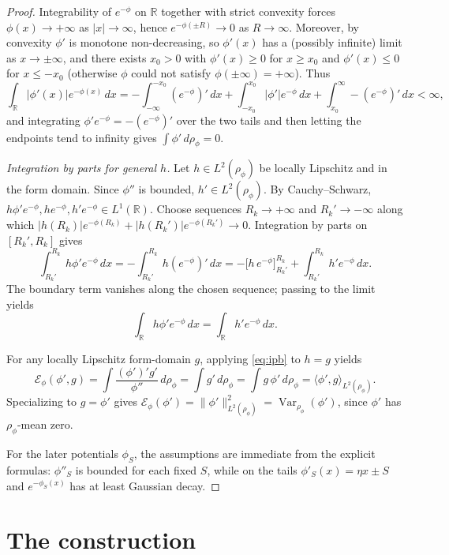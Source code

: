 \documentclass{article}
\theoremstyle{remark}
\DeclareMathOperator{\Var}{Var}
\begin{document}
\begin{proof}
Integrability of $e^{-\phi}$ on $\mathbb R$ together with strict convexity
forces $\phi(x)\to+\infty$ as $|x|\to\infty$, hence $e^{-\phi(\pm R)}\to 0$
as $R\to\infty$. Moreover, by convexity $\phi'$ is monotone non-decreasing,
so $\phi'(x)$ has a (possibly infinite) limit as $x\to\pm\infty$, and there
exists $x_0>0$ with $\phi'(x)\ge 0$ for $x\ge x_0$ and $\phi'(x)\le 0$ for
$x\le -x_0$ (otherwise $\phi$ could not satisfy $\phi(\pm\infty)=+\infty$).
Thus
\[
  \int_{\mathbb R}|\phi'(x)|e^{-\phi(x)}\,dx
  = -\int_{-\infty}^{-x_0}(e^{-\phi})'\,dx
    +\int_{-x_0}^{x_0}|\phi'|e^{-\phi}\,dx
    +\int_{x_0}^{\infty}-(e^{-\phi})'\,dx <\infty,
\]
and integrating $\phi'e^{-\phi}=-(e^{-\phi})'$ over the two tails and then
letting the endpoints tend to infinity gives
$\int\phi'\,d\rho_\phi=0$.

\emph{Integration by parts for general $h$.} Let
$h\in L^2(\rho_\phi)$ be locally Lipschitz and in the form domain. Since
$\phi''$ is bounded, $h'\in L^2(\rho_\phi)$. By Cauchy--Schwarz,
$h\phi' e^{-\phi}, h e^{-\phi}, h' e^{-\phi}\in L^1(\mathbb R)$.
Choose sequences $R_k\to+\infty$ and $R_k'\to-\infty$ along which
$|h(R_k)|e^{-\phi(R_k)}+|h(R_k')|e^{-\phi(R_k')}\to0$. Integration by parts on
$[R_k',R_k]$ gives
\[
  \int_{R_k'}^{R_k}h\phi' e^{-\phi}\,dx
  = -\int_{R_k'}^{R_k}h(e^{-\phi})'\,dx
  = -\bigl[h\,e^{-\phi}\bigr]_{R_k'}^{R_k}
    +\int_{R_k'}^{R_k}h' e^{-\phi}\,dx.
\]
The boundary term vanishes along the chosen sequence; passing to the limit
yields
\begin{equation}\label{eq:ipb}
  \int_{\mathbb R} h\phi' e^{-\phi}\,dx
  = \int_{\mathbb R} h' e^{-\phi}\,dx.
\end{equation}

For any locally Lipschitz form-domain $g$, applying \eqref{eq:ipb} to $h=g$
yields
\[
  \mathcal E_\phi(\phi',g)
  =\int\frac{(\phi')'g'}{\phi''}\,d\rho_\phi
  =\int g'\,d\rho_\phi
  =\int g\,\phi'\,d\rho_\phi
  =\langle\phi',g\rangle_{L^2(\rho_\phi)}.
\]
Specializing to $g=\phi'$ gives
$\mathcal E_\phi(\phi')=\|\phi'\|_{L^2(\rho_\phi)}^2
=\Var_{\rho_\phi}(\phi')$, since $\phi'$ has $\rho_\phi$-mean zero.

For the later potentials $\phi_S$, the assumptions are immediate from the
explicit formulas: $\phi''_S$ is bounded for each fixed $S$, while on the
tails $\phi'_S(x)=\eta x\pm S$ and $e^{-\phi_S(x)}$ has at least Gaussian
decay.
\end{proof}

\section{The construction}
\end{document}
